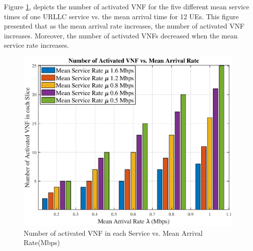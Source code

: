 \documentclass[conference]{IEEEtran}
\begin{document}
Figure \ref{fig:4}, depicts the number of activated VNF for the five different mean service times of one URLLC service vs. the mean arrival time for 12 UEs. This figure presented that as the mean arrival rate increases, the number of activated VNF increases. Moreover, the number of activated VNFs decreased when the mean service rate increases.


\begin{figure}
  \centering 
    \includegraphics[scale = 0.5]{vnfNum1.eps}
  \caption{Number of activated VNF in each Service vs. Mean Arrival Rate(Mbps)}
  \label{fig:4}
\end{figure}
\end{document}
